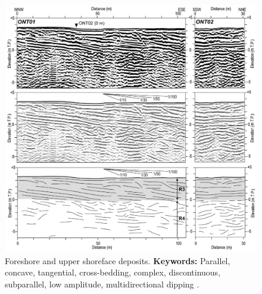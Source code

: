 \begin{figure}[h!]
    \centering
    \includegraphics[width=0.9\linewidth]{Figures/0.2GPR/Tamura2008_2.png}
    \caption[Foreshore and upper shoreface deposits.]{Foreshore and upper shoreface deposits. \textbf{Keywords: } Parallel, concave, tangential, cross-bedding, complex, discontinuous, subparallel, low amplitude, multidirectional dipping  \citep{Tamura2008}.}
    \label{fig:Tamura2008-2}
\end{figure}

